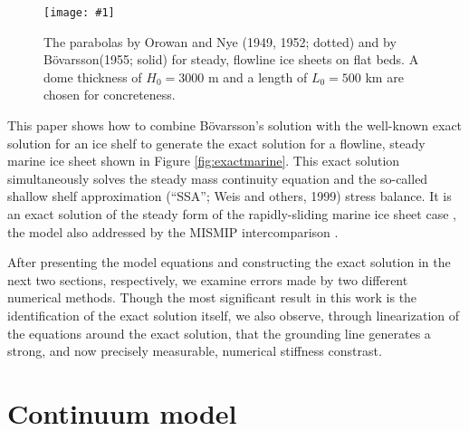 \documentclass[review,letterpaper]{igs}
\renewcommand{\dh}{\fontencoding{T1}\selectfont{\symbol{240}}}
\newcommand{\onecol}[1]{\texttt{[image: \#1]}}
\newcommand{\bod}{B\"o\dh varsson\xspace}
\begin{document}
\begin{figure}[ht]
\onecol{twoparabolas}
\caption{The parabolas by Orowan and Nye (1949, 1952; dotted) and by \bod (1955; solid) for steady, flowline ice sheets on flat beds.  A dome thickness of $H_0=3000$ m and a length of $L_0=500$ km are chosen for concreteness.} \label{fig:twoparabolas}
\end{figure}

This paper shows how to combine \bod's solution with the well-known exact solution for an ice shelf \citep{vanderVeen83,vanderVeen} to generate the exact solution for a flowline, steady marine ice sheet shown in Figure \ref{fig:exactmarine}.  This exact solution simultaneously solves the steady mass continuity equation and the so-called shallow shelf approximation (``SSA''; Weis and others, 1999)\nocite{WeisGreveHutter} stress balance.  It is an exact solution of the steady form of the rapidly-sliding marine ice sheet case \citep{SchoofMarine1}, the model also addressed by the MISMIP intercomparison \citep{MISMIP2012}.  

After presenting the model equations and constructing the exact solution in the next two sections, respectively, we examine errors made by two different numerical methods.  Though the most significant result in this work is the identification of the exact solution itself, we also observe, through linearization of the equations around the exact solution, that the grounding line generates a strong, and now precisely measurable, numerical stiffness constrast.


\section{Continuum model}
\end{document}
